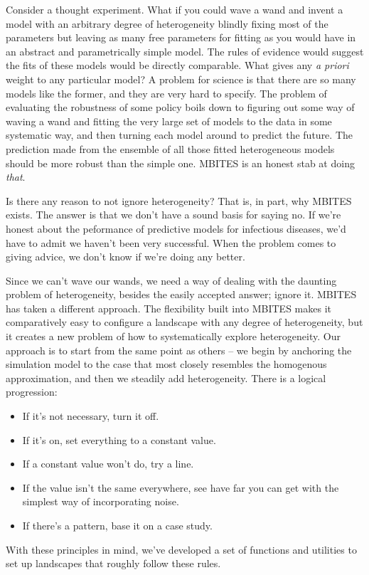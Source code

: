 \documentclass{article}
\begin{document}
Consider a thought experiment. What if you could wave a wand and invent a model with an arbitrary degree of heterogeneity blindly fixing most of the parameters but leaving as many free parameters for fitting as you would have in an abstract and parametrically simple model. The rules of evidence would suggest the fits of these  models would be directly comparable. What gives any {\em a priori} weight to any particular model? A problem for science is that there are so many models like the former, and they are very hard to specify. The problem of evaluating the robustness of some policy boils down to figuring out some way of waving a wand and fitting the very large set of models to the data in some systematic way, and then turning each model around to predict the future.  The prediction made from the ensemble of all those fitted heterogeneous models should be more robust than the simple one. MBITES is an honest stab at doing {\em that}. 

Is there any reason to not ignore heterogeneity? That is, in part, why MBITES exists. The answer is that we don't have a sound basis for saying no. If we're honest about the peformance of predictive models for infectious diseases, we'd have to admit we haven't been very successful. When the problem comes to giving advice, we don't know if we're doing any better. 

Since we can't wave our wands, we need a way of dealing with the daunting problem of heterogeneity, besides the easily accepted answer; ignore it. MBITES has taken a different approach. The flexibility built into MBITES makes it comparatively easy to configure a landscape with any degree of heterogeneity, but it creates a new problem of how to systematically explore heterogeneity.  Our approach is to start from the same point as others -- we begin by anchoring the simulation model to the case that most closely resembles the homogenous approximation, and then we steadily add heterogeneity. There is a logical progression: 
\begin{itemize}
\item If it's not necessary, turn it off. 
\item If it's on, set everything to a constant value. 
\item If a constant value won't do, try a line. 
\item If the value isn't the same everywhere, see have far you can get with the simplest way of incorporating noise.
\item If there's a pattern, base it on a case study.  
\end{itemize}
With these principles in mind, we've developed a set of functions and utilities to set up landscapes that roughly follow these rules. 
\end{document}
